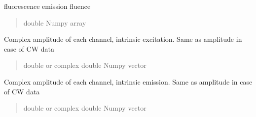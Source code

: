 \documentclass[letterpaper,10pt,english]{sphinxmanual}
\begin{document}
\begin{fulllineitems}

\begin{fulllineitems}
\label{\detokenize{_autosummary/nirfasterff.base.data.FLdata:nirfasterff.base.data.FLdata.phifl}}
\pysigstartsignatures
\pysigline
{}
\pysigstopsignatures
\sphinxAtStartPar
fluorescence emission fluence
\begin{quote}\begin{description}
\sphinxAtStartPar
double Numpy array

\end{description}\end{quote}

\end{fulllineitems}


\begin{fulllineitems}
\label{\detokenize{_autosummary/nirfasterff.base.data.FLdata:nirfasterff.base.data.FLdata.complexx}}
\pysigstartsignatures
\pysigline
{}
\pysigstopsignatures
\sphinxAtStartPar
Complex amplitude of each channel, intrinsic excitation. Same as amplitude in case of CW data
\begin{quote}\begin{description}
\sphinxAtStartPar
double or complex double Numpy vector

\end{description}\end{quote}

\end{fulllineitems}


\begin{fulllineitems}
\label{\detokenize{_autosummary/nirfasterff.base.data.FLdata:nirfasterff.base.data.FLdata.complexmm}}
\pysigstartsignatures
\pysigline
{}
\pysigstopsignatures
\sphinxAtStartPar
Complex amplitude of each channel, intrinsic emission. Same as amplitude in case of CW data
\begin{quote}\begin{description}
\sphinxAtStartPar
double or complex double Numpy vector


\end{description}
\end{quote}
\end{fulllineitems}
\end{fulllineitems}
\end{document}
